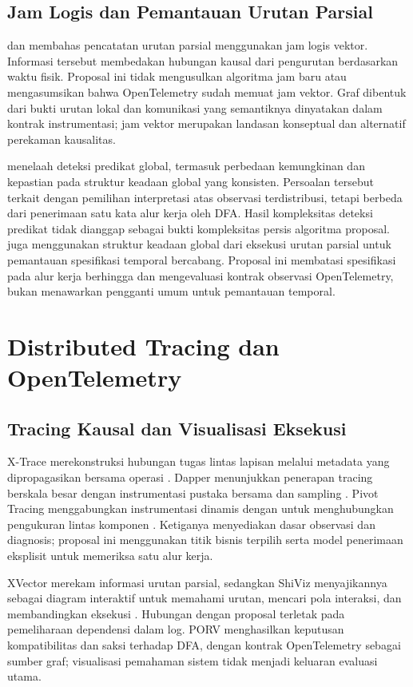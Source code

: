 \subsection{Jam Logis dan Pemantauan Urutan Parsial}
\citet{fidge1988} dan \citet{mattern1989} membahas pencatatan urutan parsial menggunakan jam logis vektor. Informasi tersebut membedakan hubungan kausal dari pengurutan berdasarkan waktu fisik. Proposal ini tidak mengusulkan algoritma jam baru atau mengasumsikan bahwa  OpenTelemetry sudah memuat jam vektor. Graf dibentuk dari bukti urutan lokal dan komunikasi yang semantiknya dinyatakan dalam kontrak instrumentasi; jam vektor merupakan landasan konseptual dan alternatif perekaman kausalitas.

\citet{chase1998} menelaah deteksi predikat global, termasuk perbedaan kemungkinan dan kepastian pada struktur keadaan global yang konsisten. Persoalan tersebut terkait dengan pemilihan interpretasi atas observasi terdistribusi, tetapi berbeda dari penerimaan satu kata alur kerja oleh DFA. Hasil kompleksitas deteksi predikat tidak dianggap sebagai bukti kompleksitas persis algoritma proposal. \citet{omer2025} juga menggunakan struktur keadaan global dari eksekusi urutan parsial untuk pemantauan spesifikasi temporal bercabang. Proposal ini membatasi spesifikasi pada alur kerja berhingga dan mengevaluasi kontrak observasi OpenTelemetry, bukan menawarkan pengganti umum untuk pemantauan temporal.

\section{Distributed Tracing dan OpenTelemetry}
\subsection{Tracing Kausal dan Visualisasi Eksekusi}
X-Trace merekonstruksi hubungan tugas lintas lapisan melalui metadata yang dipropagasikan bersama operasi \citep{xtrace2007}. Dapper menunjukkan penerapan tracing berskala besar dengan instrumentasi pustaka bersama dan sampling \citep{dapper2010}. Pivot Tracing menggabungkan instrumentasi dinamis dengan  untuk menghubungkan pengukuran lintas komponen \citep{pivot2015}. Ketiganya menyediakan dasar observasi dan diagnosis; proposal ini menggunakan titik bisnis terpilih serta model penerimaan eksplisit untuk memeriksa satu alur kerja.

XVector merekam informasi urutan parsial, sedangkan ShiViz menyajikannya sebagai diagram interaktif untuk memahami urutan, mencari pola interaksi, dan membandingkan eksekusi \citep{shiviz2020}. Hubungan dengan proposal terletak pada pemeliharaan dependensi dalam log. PORV menghasilkan keputusan kompatibilitas dan saksi terhadap DFA, dengan kontrak OpenTelemetry sebagai sumber graf; visualisasi pemahaman sistem tidak menjadi keluaran evaluasi utama.

